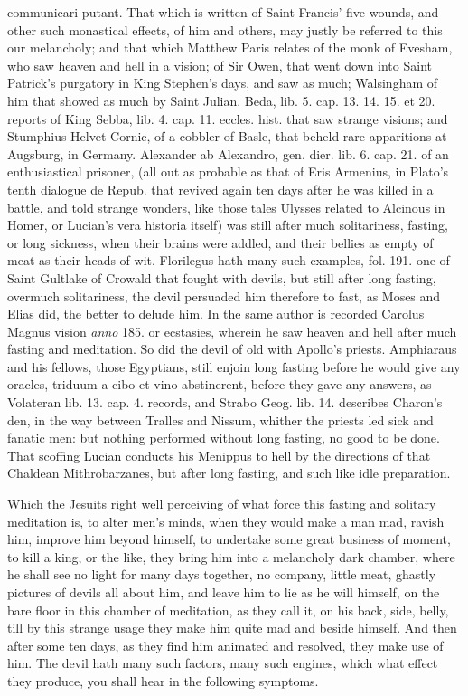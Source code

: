 {{communicari putant.} That which is written of Saint Francis' five
wounds, and other such monastical effects, of him and others, may
justly be referred to this our melancholy; and that which Matthew Paris
relates of the monk of Evesham, who saw heaven and hell in a
vision; of Sir Owen, that went down into Saint Patrick's
purgatory in King Stephen's days, and saw as much; Walsingham of him
that showed as much by Saint Julian. Beda, lib. 5. cap. 13. 14. 15. et
20. reports of King Sebba, lib. 4. cap. 11. eccles. hist. that saw
strange visions; and Stumphius Helvet Cornic, of a cobbler of Basle,
that beheld rare apparitions at Augsburg, in Germany. Alexander
ab Alexandro, gen. dier. lib. 6. cap. 21. of an enthusiastical
prisoner, (all out as probable as that of Eris Armenius, in Plato's
tenth dialogue de Repub. that revived again ten days after he was
killed in a battle, and told strange wonders, like those tales Ulysses
related to Alcinous in Homer, or Lucian's vera historia itself) was
still after much solitariness, fasting, or long sickness, when their
brains were addled, and their bellies as empty of meat as their heads
of wit. Florilegus hath many such examples, fol. 191. one of Saint
Gultlake of Crowald that fought with devils, but still after long
fasting, overmuch solitariness, the devil persuaded him therefore
to fast, as Moses and Elias did, the better to delude him. In the
same author is recorded Carolus Magnus vision \emph{anno} 185. or ecstasies,
wherein he saw heaven and hell after much fasting and meditation. So
did the devil of old with Apollo's priests. Amphiaraus and his fellows,
those Egyptians, still enjoin long fasting before he would give any
oracles, triduum a cibo et vino abstinerent, before they gave any
answers, as Volateran lib. 13. cap. 4. records, and Strabo Geog. lib.
14. describes Charon's den, in the way between Tralles and Nissum,
whither the priests led sick and fanatic men: but nothing performed
without long fasting, no good to be done. That scoffing Lucian
conducts his Menippus to hell by the directions of that Chaldean
Mithrobarzanes, but after long fasting, and such like idle preparation.

Which the Jesuits right well perceiving of what force this fasting and
solitary meditation is, to alter men's minds, when they would make a
man mad, ravish him, improve him beyond himself, to undertake some
great business of moment, to kill a king, or the like, they bring
him into a melancholy dark chamber, where he shall see no light for
many days together, no company, little meat, ghastly pictures of devils
all about him, and leave him to lie as he will himself, on the bare
floor in this chamber of meditation, as they call it, on his back,
side, belly, till by this strange usage they make him quite mad and
beside himself. And then after some ten days, as they find him animated
and resolved, they make use of him. The devil hath many such factors,
many such engines, which what effect they produce, you shall hear in
the following symptoms.

}
